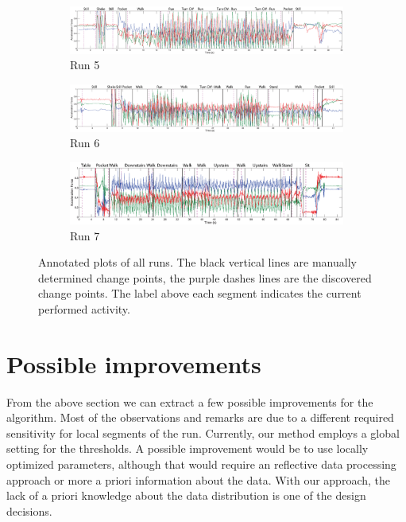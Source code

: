 \begin{figure}
  \begin{subfigure}{1\textwidth}
    \includegraphics[width=\textwidth]{./Figures/chapter6/data_collection/run-5-run-fountain-jos/data_plot_acc_with_discovered_cps.eps}
    \caption{Run 5}
    \label{fig:data_with_cps_run_5}
  \end{subfigure}

  \begin{subfigure}{1\textwidth}
    \includegraphics[width=\textwidth]{./Figures/chapter6/data_collection/run-6-walk-run-roemer/data_plot_acc_with_discovered_cps.eps}
    \caption{Run 6}
    \label{fig:data_with_cps_run_6}
  \end{subfigure}

  \begin{subfigure}{1\textwidth}
    \includegraphics[width=\textwidth]{./Figures/chapter6/data_collection/stairs-1-marc/data_plot_acc_with_discovered_cps.eps}
    \caption{Run 7}
    \label{fig:data_with_cps_run_7}
  \end{subfigure}

  \caption[Results run 1/8]{Annotated plots of all runs. The black vertical lines are manually determined change points, the purple dashes lines are the discovered change points. The label above each segment indicates the current performed activity.}\label{fig:plots_all_runs_results}
\end{figure}


\section{Possible improvements}\label{sec:possible_improvements}
From the above section we can extract a few possible improvements for the algorithm.
Most of the observations and remarks are due to a different required sensitivity for local segments of the run.
Currently, our method employs a global setting for the thresholds.
A possible improvement would be to use locally optimized parameters, although that would require an reflective data processing approach or more a priori information about the data.
With our approach, the lack of a priori knowledge about the data distribution is one of the design decisions.

